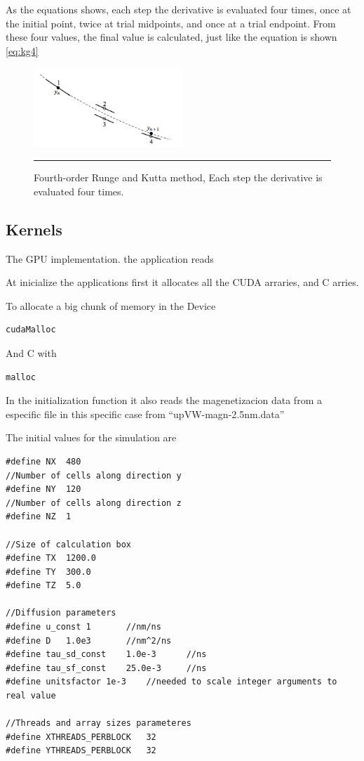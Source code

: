 As the equations shows, each step the derivative is evaluated four times, once at the initial point, twice at trial midpoints, and once at a trial endpoint. From these four values, the final value is calculated, just like the equation is shown \ref{eq:kg4}

\begin{figure}[htbp]
	\centering
		\includegraphics[width=0.5\textwidth]{Figures/rk4.png}
		\rule{35em}{0.5pt}
	\caption[Fourth-order Runge and Kutta Method]{Fourth-order Runge and Kutta method, Each step the derivative is evaluated four times. }
	\label{fig:kutta}
\end{figure}

\cite{numerical}





\subsection{Kernels}

The GPU implementation. the application reads

At inicialize the applications first it allocates all the CUDA arraries, and C arries.

To allocate a big chunk of memory in the Device 

\begin{lstlisting}[frame=none]
cudaMalloc
\end{lstlisting}
And C with

\begin{lstlisting}[frame=none]
malloc
\end{lstlisting}

In the initialization function it also reads the magenetizacion data from a especific file in this specific case from ``upVW-magn-2.5nm.data''


The initial values for the simulation are

\begin{lstlisting}[frame=none]
#define NX	480		
//Number of cells along direction y
#define NY	120
//Number of cells along direction z
#define NZ	1

//Size of calculation box
#define TX	1200.0
#define TY	300.0
#define TZ	5.0

//Diffusion parameters
#define u_const	1  		//nm/ns
#define D  	1.0e3		//nm^2/ns
#define tau_sd_const 	1.0e-3		//ns
#define tau_sf_const 	25.0e-3		//ns
#define unitsfactor 1e-3	//needed to scale integer arguments to real value

//Threads and array sizes parameteres
#define XTHREADS_PERBLOCK	32
#define	YTHREADS_PERBLOCK	32
\end{lstlisting}


